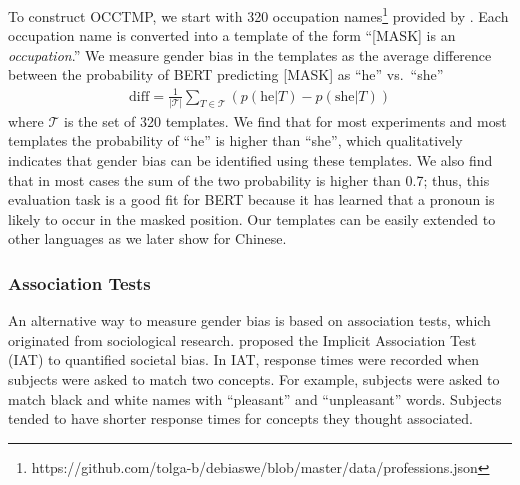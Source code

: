 To construct OCCTMP,
we start with 
320 occupation
names\footnote{https://github.com/tolga-b/debiaswe/blob/master/data/professions.json}
provided by \cite{bolukbasi2016man}.
Each occupation name is converted into a template of the form
``[MASK] is an \textit{occupation}.''
We measure
gender bias
in the templates as the average difference
between the probability of BERT predicting [MASK] as ``he''
vs.\ ``she''
\begin{eqnarray}
\text{diff}=\frac{1}{|{\mathcal T}|} \sum_{T \in
	{\mathcal T}}(p(\mbox{he}| T) - p(\mbox{she}|T))\nonumber
\end{eqnarray}
where $\mathcal T$ is the set of 320 templates.  We find
that for most experiments and most templates the probability
of ``he'' is higher than ``she'', which qualitatively
indicates that gender bias can be identified using these templates. We
also find that in most cases the sum of the two probability
is higher than 0.7; thus, this evaluation task is a good fit
for BERT because it has learned that a pronoun is likely to
occur in the masked position.
Our templates  can be easily extended to other
languages
as we later show for
Chinese.
\subsubsection{Association Tests}\label{sec:weat}
An alternative way to measure gender bias is based on association tests, which originated from sociological research. \cite{greenwald1998measuring} proposed the Implicit Association Test (IAT) to quantified societal bias. In IAT, response times were recorded when subjects were asked to match two concepts. For example, subjects were asked to match black and white names with “pleasant” and “unpleasant” words. Subjects tended to have shorter response times for concepts they thought associated. 

